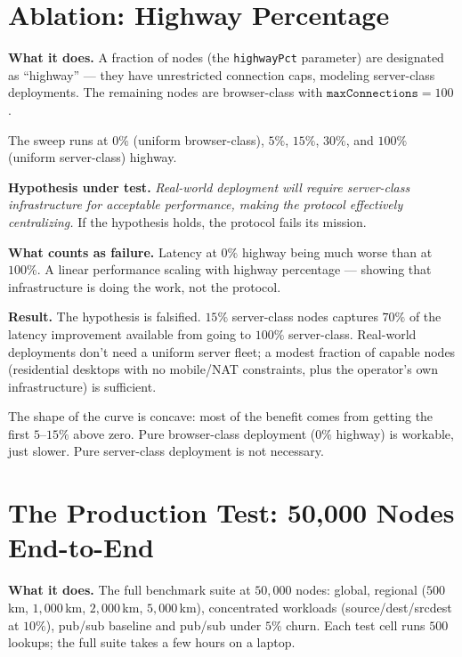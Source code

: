 \documentclass[twoside,nobib]{tufte-book}
\begin{document}
\section{Ablation: Highway Percentage}

\textbf{What it does.} A fraction of nodes (the
\texttt{highwayPct} parameter) are designated as
``highway'' --- they have unrestricted connection caps,
modeling server-class deployments. The remaining nodes are
browser-class with $\texttt{maxConnections} = 100$.

The sweep runs at $0\%$ (uniform browser-class), $5\%$, $15\%$,
$30\%$, and $100\%$ (uniform server-class) highway.

\textbf{Hypothesis under test.} \emph{Real-world deployment will
require server-class infrastructure for acceptable performance,
making the protocol effectively centralizing.} If the hypothesis
holds, the protocol fails its mission.

\textbf{What counts as failure.} Latency at $0\%$ highway being
much worse than at $100\%$. A linear performance scaling with
highway percentage --- showing that infrastructure is doing the
work, not the protocol.

\textbf{Result.} The hypothesis is falsified.
$15\%$ server-class nodes captures $70\%$ of the latency
improvement available from going to $100\%$ server-class.
Real-world deployments don't need a uniform server fleet; a
modest fraction of capable nodes (residential desktops with no
mobile/NAT constraints, plus the operator's own infrastructure)
is sufficient.

The shape of the curve is concave: most of the benefit comes
from getting the first $5$--$15\%$ above zero. Pure
browser-class deployment ($0\%$ highway) is workable, just
slower. Pure server-class deployment is not necessary.

\section{The Production Test: 50,000 Nodes End-to-End}

\textbf{What it does.} The full benchmark suite at $50{,}000$
nodes: global, regional ($500$\,km, $1{,}000$\,km, $2{,}000$\,km,
$5{,}000$\,km), concentrated workloads (source/dest/srcdest at
$10\%$), pub/sub baseline and pub/sub under $5\%$ churn. Each
test cell runs $500$ lookups; the full suite takes a few hours
on a laptop.
\end{document}
